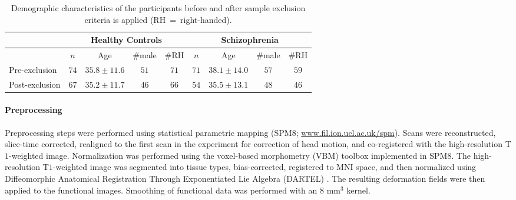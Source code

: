 \newcommand{\mycellcol}{\cellcolor{blue!25}}
\begin{table}[t!]
	\centering
	\begin{tabular}{l|cccc|cccc}
		\multicolumn{1}{c}{}&\multicolumn{4}{c}{\textbf{Healthy Controls}}&\multicolumn{4}{c}{\textbf{Schizophrenia}}\\
		\hline
			& $n$ & Age & \#male & \#RH & $n$ & Age & \#male & \#RH \\		
		\hline\hline
		 Pre-exclusion 	& $74$ & $35.8\pm 11.6$ & $51$ & $71$ 
		 		  		& $71$ & $38.1\pm 14.0$ & $57$ & $59$ \\
		 Post-exclusion 	& $67$ & $35.2\pm 11.7$ & $46$ & $66$ 
		 				& $54$ & $35.5\pm 13.1$ & $48$ & $46$ \\
		\hline
	\end{tabular}
	\caption{
		Demographic characteristics of the participants before and after sample exclusion criteria is applied \mbox{(RH = right-handed)}.
	}
	\label{table:schiz,demographic}
\end{table}

\paragraph{Preprocessing}
Preprocessing steps were performed using statistical parametric mapping (SPM$8$; \url{www.fil.ion.ucl.ac.uk/spm}). 
Scans were reconstructed, slice-time corrected, realigned to the first scan in the experiment for correction of head motion, and co-registered with the high-resolution T$1$-weighted image. 
Normalization was performed using the voxel-based morphometry (VBM) toolbox implemented in SPM$8$. 
The high-resolution T$1$-weighted image was segmented into tissue types, bias-corrected, registered to MNI space, and then normalized using Diffeomorphic Anatomical Registration Through Exponentiated Lie Algebra (DARTEL) \citep{Ashburner:2007}. 
The resulting deformation fields were then applied to the functional images. 
Smoothing of functional data was performed with an $8$ mm$^3$ kernel.

